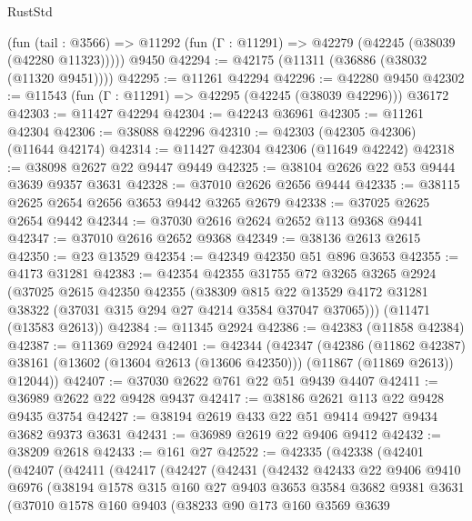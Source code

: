 \begin{lexlean}{RustStd}
\begin{coremodule}
    (fun (tail : @3566) => @11292 (fun (Γ : @11291) => @42279 (@42245 (@38039 (@42280 @11323)))))
    @9450
@42294 := @42175 (@11311 (@36886 (@38032 (@11320 @9451))))
@42295 := @11261 @42294
@42296 := @42280 @9450
@42302 := @11543 (fun (Γ : @11291) => @42295 (@42245 (@38039 @42296))) @36172
@42303 := @11427 @42294
@42304 := @42243 @36961
@42305 := @11261 @42304
@42306 := @38088 @42296
@42310 := @42303 (@42305 @42306) (@11644 @42174)
@42314 := @11427 @42304 @42306 (@11649 @42242)
@42318 := @38098 @2627 @22 @9447 @9449
@42325 := @38104 @2626 @22 @53 @9444 @3639 @9357 @3631
@42328 := @37010 @2626 @2656 @9444
@42335 := @38115 @2625 @2654 @2656 @3653 @9442 @3265 @2679
@42338 := @37025 @2625 @2654 @9442
@42344 := @37030 @2616 @2624 @2652 @113 @9368 @9441
@42347 := @37010 @2616 @2652 @9368
@42349 := @38136 @2613 @2615
@42350 := @23 @13529
@42354 := @42349 @42350 @51 @896 @3653
@42355 := @4173 @31281
@42383 := @42354
    @42355
    @31755
    @72
    @3265
    @3265
    @2924
    (@37025
      @2615
      @42350
      @42355
      (@38309 @815 @22 @13529 @4172 @31281 @38322 (@37031 @315 @294 @27 @4214 @3584 @37047 @37065)))
    (@11471 (@13583 @2613))
@42384 := @11345 @2924
@42386 := @42383 (@11858 @42384)
@42387 := @11369 @2924
@42401 := @42344
    (@42347
      (@42386
        (@11862 @42387)
        @38161
        (@13602 (@13604 @2613 (@13606 @42350)))
        (@11867 (@11869 @2613))
        @12044))
@42407 := @37030 @2622 @761 @22 @51 @9439 @4407
@42411 := @36989 @2622 @22 @9428 @9437
@42417 := @38186 @2621 @113 @22 @9428 @9435 @3754
@42427 := @38194 @2619 @433 @22 @51 @9414 @9427 @9434 @3682 @9373 @3631
@42431 := @36989 @2619 @22 @9406 @9412
@42432 := @38209 @2618
@42433 := @161 @27
@42522 := @42335
    (@42338
      (@42401
        (@42407
          (@42411
            (@42417
              (@42427
                (@42431
                  (@42432
                    @42433
                    @22
                    @9406
                    @9410
                    @6976
                    (@38194
                      @1578
                      @315
                      @160
                      @27
                      @9403
                      @3653
                      @3584
                      @3682
                      @9381
                      @3631
                      (@37010
                        @1578
                        @160
                        @9403
                        (@38233
                          @90
                          @173
                          @160
                          @3569
                          @3639

\end{coremodule}
\end{lexlean}
